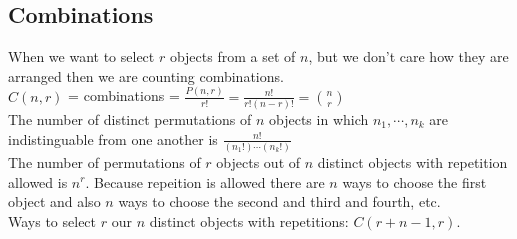 \documentclass[14pt]{extreport}
\begin{document}
\subsection{Combinations}
When we want to select $r$ objects from a set of $n$, but we don't care how they are arranged then we are counting combinations.\\
$C(n,r)$ = combinations = $\frac{P(n,r)}{r!} = \frac{n!}{r!(n-r)!} = \binom{n}{r}$\\

The number of distinct permutations of $n$ objects in which $n_1 ,\cdots, n_k$ are indistinguable from one another is $\frac{n!}{(n_1!) \cdots (n_k!)}$\\

The number of permutations of $r$ objects out of $n$ distinct objects with repetition allowed is $n^r$. Because repeition is allowed there
are $n$ ways to choose the first object and also $n$ ways to choose the second and third and fourth, etc.\\

Ways to select $r$ our $n$ distinct objects with repetitions: $C(r+n-1,r)$.\\
\end{document}
